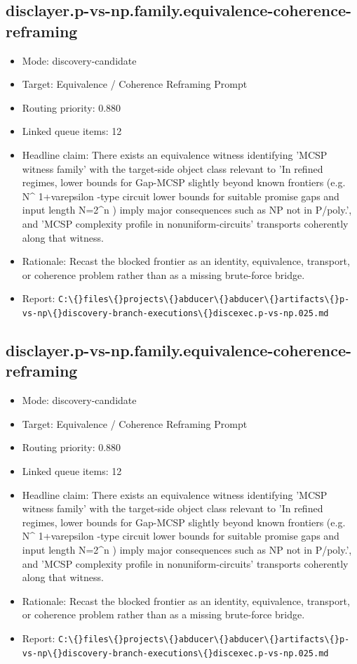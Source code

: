 \documentclass[11pt]{article}
\begin{document}
\subsection*{disclayer.p-vs-np.family.equivalence-coherence-reframing}
\begin{itemize}
\item Mode: discovery-candidate
\item Target: Equivalence / Coherence Reframing Prompt
\item Routing priority: 0.880
\item Linked queue items: 12
\item Headline claim: There exists an equivalence witness identifying 'MCSP witness family' with the target-side object class relevant to 'In refined regimes, lower bounds for Gap-MCSP slightly beyond known frontiers (e.g. N\textasciicircum{} 1+varepsilon -type circuit lower bounds for suitable promise gaps and input length N=2\textasciicircum{}n ) imply major consequences such as NP not in P/poly.', and 'MCSP complexity profile in nonuniform-circuits' transports coherently along that witness.
\item Rationale: Recast the blocked frontier as an identity, equivalence, transport, or coherence problem rather than as a missing brute-force bridge.
\item Report: \texttt{C:\textbackslash\{\}files\textbackslash\{\}projects\textbackslash\{\}abducer\textbackslash\{\}abducer\textbackslash\{\}artifacts\textbackslash\{\}p-vs-np\textbackslash\{\}discovery-branch-executions\textbackslash\{\}discexec.p-vs-np.025.md}
\end{itemize}

\subsection*{disclayer.p-vs-np.family.equivalence-coherence-reframing}
\begin{itemize}
\item Mode: discovery-candidate
\item Target: Equivalence / Coherence Reframing Prompt
\item Routing priority: 0.880
\item Linked queue items: 12
\item Headline claim: There exists an equivalence witness identifying 'MCSP witness family' with the target-side object class relevant to 'In refined regimes, lower bounds for Gap-MCSP slightly beyond known frontiers (e.g. N\textasciicircum{} 1+varepsilon -type circuit lower bounds for suitable promise gaps and input length N=2\textasciicircum{}n ) imply major consequences such as NP not in P/poly.', and 'MCSP complexity profile in nonuniform-circuits' transports coherently along that witness.
\item Rationale: Recast the blocked frontier as an identity, equivalence, transport, or coherence problem rather than as a missing brute-force bridge.
\item Report: \texttt{C:\textbackslash\{\}files\textbackslash\{\}projects\textbackslash\{\}abducer\textbackslash\{\}abducer\textbackslash\{\}artifacts\textbackslash\{\}p-vs-np\textbackslash\{\}discovery-branch-executions\textbackslash\{\}discexec.p-vs-np.025.md}
\end{itemize}
\end{document}
